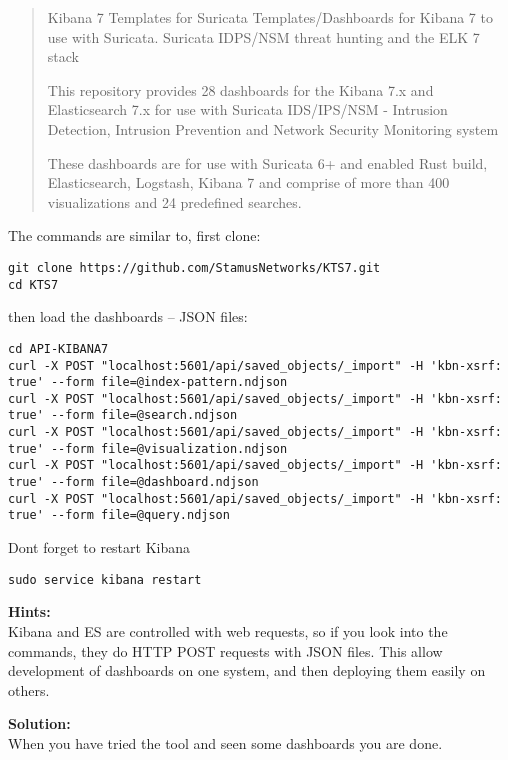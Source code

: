 \documentclass[a4paper,11pt,notitlepage]{report}
\begin{document}

\begin{quote}
Kibana 7 Templates for Suricata
Templates/Dashboards for Kibana 7 to use with Suricata. Suricata IDPS/NSM threat hunting and the ELK 7 stack

This repository provides 28 dashboards for the Kibana 7.x and Elasticsearch 7.x for use with Suricata IDS/IPS/NSM - Intrusion Detection, Intrusion Prevention and Network Security Monitoring system

These dashboards are for use with Suricata 6+ and enabled Rust build, Elasticsearch, Logstash, Kibana 7 and comprise of more than 400 visualizations and 24 predefined searches.
\end{quote}

The commands are similar to, first clone:
\begin{verbatim}
git clone https://github.com/StamusNetworks/KTS7.git
cd KTS7
\end{verbatim}

then load the dashboards -- JSON files:
\begin{verbatim}
cd API-KIBANA7
curl -X POST "localhost:5601/api/saved_objects/_import" -H 'kbn-xsrf: true' --form file=@index-pattern.ndjson
curl -X POST "localhost:5601/api/saved_objects/_import" -H 'kbn-xsrf: true' --form file=@search.ndjson
curl -X POST "localhost:5601/api/saved_objects/_import" -H 'kbn-xsrf: true' --form file=@visualization.ndjson
curl -X POST "localhost:5601/api/saved_objects/_import" -H 'kbn-xsrf: true' --form file=@dashboard.ndjson
curl -X POST "localhost:5601/api/saved_objects/_import" -H 'kbn-xsrf: true' --form file=@query.ndjson
\end{verbatim}

Dont forget to restart Kibana
\begin{verbatim}
sudo service kibana restart
\end{verbatim}


{\bf Hints:}\\
Kibana and ES are controlled with web requests, so if you look into the commands, they do HTTP POST requests with JSON files. This allow development of dashboards on one system, and then deploying them easily on others.

{\bf Solution:}\\
When you have tried the tool and seen some dashboards you are done.
\end{document}
